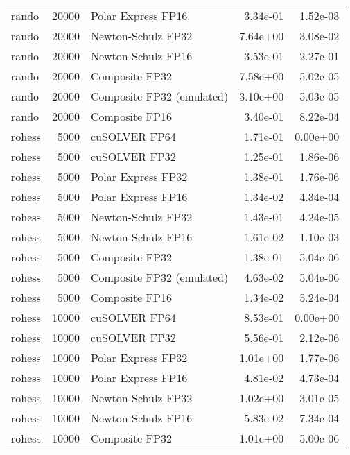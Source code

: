 \begin{table}
\begin{tabular}{lrlrr}
    rando & 20000 &        Polar Express FP16 &  3.34e-01 &        1.52e-03 \\
    rando & 20000 &        Newton-Schulz FP32 &  7.64e+00 &        3.08e-02 \\
    rando & 20000 &        Newton-Schulz FP16 &  3.53e-01 &        2.27e-01 \\
    rando & 20000 &            Composite FP32 &  7.58e+00 &        5.02e-05 \\
    rando & 20000 & Composite FP32 (emulated) &  3.10e+00 &        5.03e-05 \\
    rando & 20000 &            Composite FP16 &  3.40e-01 &        8.22e-04 \\
   rohess &  5000 &             cuSOLVER FP64 &  1.71e-01 &        0.00e+00 \\
   rohess &  5000 &             cuSOLVER FP32 &  1.25e-01 &        1.86e-06 \\
   rohess &  5000 &        Polar Express FP32 &  1.38e-01 &        1.76e-06 \\
   rohess &  5000 &        Polar Express FP16 &  1.34e-02 &        4.34e-04 \\
   rohess &  5000 &        Newton-Schulz FP32 &  1.43e-01 &        4.24e-05 \\
   rohess &  5000 &        Newton-Schulz FP16 &  1.61e-02 &        1.10e-03 \\
   rohess &  5000 &            Composite FP32 &  1.38e-01 &        5.04e-06 \\
   rohess &  5000 & Composite FP32 (emulated) &  4.63e-02 &        5.04e-06 \\
   rohess &  5000 &            Composite FP16 &  1.34e-02 &        5.24e-04 \\
   rohess & 10000 &             cuSOLVER FP64 &  8.53e-01 &        0.00e+00 \\
   rohess & 10000 &             cuSOLVER FP32 &  5.56e-01 &        2.12e-06 \\
   rohess & 10000 &        Polar Express FP32 &  1.01e+00 &        1.77e-06 \\
   rohess & 10000 &        Polar Express FP16 &  4.81e-02 &        4.73e-04 \\
   rohess & 10000 &        Newton-Schulz FP32 &  1.02e+00 &        3.01e-05 \\
   rohess & 10000 &        Newton-Schulz FP16 &  5.83e-02 &        7.34e-04 \\
   rohess & 10000 &            Composite FP32 &  1.01e+00 &        5.00e-06 \\

\end{tabular}
\end{table}
